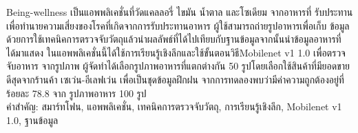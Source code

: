\begin{thaiabstract}
    Being-wellness เป็นแอพพลิเคชั่นที่วัดแคลลอรี่ ไขมัน น้ำตาล และโซเดียม จากอาหารที่
    รับประทานเพื่อทำนายความเสี่ยงของโรคที่เกิดจากการรับประทานอาหาร ผู้ใช้สามารถถ่ายรูปอาหารเพื่อเก็บ
    ข้อมูลด้วยการใช้เทคนิคการตรวจจับวัตถุแล้วนำผลลัพธ์ที่ได้ไปเทียบกับฐานข้อมูลจากนั้นนำข้อมูลอาหารที่
    ได้มาแสดง ในแอพพลิเคชั่นนี้ได้ใช้การเรียนรู้เชิงลึกและใช้ขั้นตอนวิธีMobilenet v1 1.0 เพื่อตรวจจับอาหาร
    จากรูปภาพ ผู้จัดทำได้เลือกรูปภาพอาหารที่แตกต่างกัน 50 รูปโดยเลือกใช้สินค้าที่มียอดขายดีสุดจากร้านค้า
    เซเว่น-อีเลฟเว่น เพื่อเป็นชุดข้อมูลฝึกฝน จากการทดลองพบว่ามีค่าความถูกต้องอยู่ที่ร้อยละ 78.8 จาก
    รูปภาพอาหาร 100 รูป
\noindent
\\คำสำคัญ: สมาร์ทโฟน, แอพพลิเคชั่น, เทคนิคการตรวจจับวัตถุ, การเรียนรู้เชิงลึก, Mobilenet v1 1.0,
ฐานข้อมูล
\end{thaiabstract}
